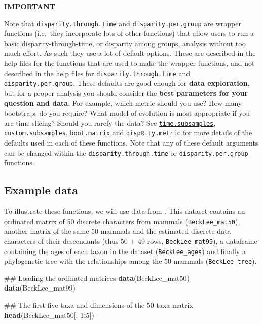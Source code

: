 \documentclass[]{book}
\newenvironment{Shaded}{\begin{snugshade}}{\end{snugshade}}
\newcommand{\KeywordTok}[1]{\textcolor[rgb]{0.13,0.29,0.53}{\textbf{#1}}}
\newcommand{\DecValTok}[1]{\textcolor[rgb]{0.00,0.00,0.81}{#1}}
\newcommand{\OperatorTok}[1]{\textcolor[rgb]{0.81,0.36,0.00}{\textbf{#1}}}
\newcommand{\NormalTok}[1]{#1}
\theoremstyle{definition}
\theoremstyle{definition}
\theoremstyle{remark}
\begin{document}
\textbf{IMPORTANT}

Note that \texttt{disparity.through.time} and
\texttt{disparity.per.group} are wrapper functions (i.e.~they
incorporate lots of other functions) that allow users to run a basic
disparity-through-time, or disparity among groups, analysis without too
much effort. As such they use a lot of default options. These are
described in the help files for the functions that are used to make the
wrapper functions, and not described in the help files for
\texttt{disparity.through.time} and \texttt{disparity.per.group}. These
defaults are good enough for \textbf{data exploration}, but for a proper
analysis you should consider the \textbf{best parameters for your
question and data}. For example, which metric should you use? How many
bootstraps do you require? What model of evolution is most appropriate
if you are time slicing? Should you rarefy the data? See
\protect\hyperlink{time-slicing}{\texttt{time.subsamples}},
\protect\hyperlink{customised-subsamples}{\texttt{custom.subsamples}},
\protect\hyperlink{bootstraps-and-rarefactions}{\texttt{boot.matrix}}
and \protect\hyperlink{disparity-metrics}{\texttt{dispRity.metric}} for
more details of the defaults used in each of these functions. Note that
any of these default arguments can be changed within the
\texttt{disparity.through.time} or \texttt{disparity.per.group}
functions.

\hypertarget{example-data}{\subsection{Example
data}\label{example-data}}

To illustrate these functions, we will use data from
\citet{beckancient2014}. This dataset contains an ordinated matrix of 50
discrete characters from mammals (\texttt{BeckLee\_mat50}), another
matrix of the same 50 mammals and the estimated discrete data characters
of their descendants (thus 50 + 49 rows, \texttt{BeckLee\_mat99}), a
dataframe containing the ages of each taxon in the dataset
(\texttt{BeckLee\_ages}) and finally a phylogenetic tree with the
relationships among the 50 mammals (\texttt{BeckLee\_tree}).

\begin{Shaded}
\begin{Highlighting}[]
\NormalTok{## Loading the ordinated matrices}
\KeywordTok{data}\NormalTok{(BeckLee_mat50)}
\KeywordTok{data}\NormalTok{(BeckLee_mat99)}

\NormalTok{## The first five taxa and dimensions of the 50 taxa matrix}
\KeywordTok{head}\NormalTok{(BeckLee_mat50[, }\DecValTok{1}\OperatorTok{:}\DecValTok{5}\NormalTok{])}
\end{Highlighting}
\end{Shaded}
\end{document}
